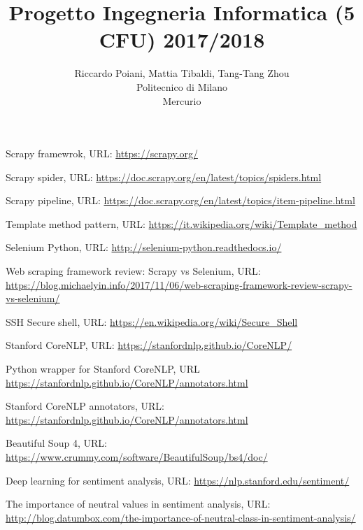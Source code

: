 \documentclass[a4paper]{article}
\begin{document}
\title{Progetto Ingegneria Informatica (5 CFU) 2017/2018}
\author{
        Riccardo Poiani, Mattia Tibaldi, Tang-Tang Zhou \\
        Politecnico di Milano\\  
        Mercurio              
}
\maketitle
\newpage
\tableofcontents
{}
\newpage


\newpage

\newpage

\newpage

\clearpage
\begin{thebibliography}{9}
Scrapy framewrok, URL: \url{https://scrapy.org/}

Scrapy spider, URL: \url{https://doc.scrapy.org/en/latest/topics/spiders.html}

Scrapy pipeline, URL: \url{https://doc.scrapy.org/en/latest/topics/item-pipeline.html}

Template method pattern, URL: \url{https://it.wikipedia.org/wiki/Template_method}

Selenium Python, URL: \url{http://selenium-python.readthedocs.io/}

Web scraping framework review: Scrapy vs Selenium, URL: \url{https://blog.michaelyin.info/2017/11/06/web-scraping-framework-review-scrapy-vs-selenium/}

SSH Secure shell, URL: \url{https://en.wikipedia.org/wiki/Secure_Shell}

Stanford CoreNLP, URL: \url{https://stanfordnlp.github.io/CoreNLP/}

Python wrapper for Stanford CoreNLP, URL \url{https://stanfordnlp.github.io/CoreNLP/annotators.html}

Stanford CoreNLP annotators, URL: \url{https://stanfordnlp.github.io/CoreNLP/annotators.html}

Beautiful Soup 4, URL: \url{https://www.crummy.com/software/BeautifulSoup/bs4/doc/}

Deep learning for sentiment analysis, URL: \url{https://nlp.stanford.edu/sentiment/}

The importance of neutral values in sentiment analysis, URL: \url{http://blog.datumbox.com/the-importance-of-neutral-class-in-sentiment-analysis/}

\end{thebibliography}
\end{document}
